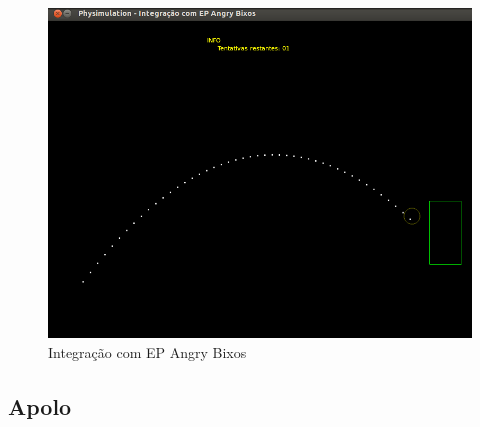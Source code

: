 \begin{figure}[H]
	\includegraphics[scale=0.22]{images/angry-bixos-4E.png}
	\caption{Integração com EP Angry Bixos}
\end{figure}

\subsection{Apolo}

